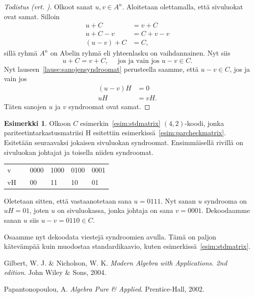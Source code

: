 \documentclass[a4paper,12pt,leqno,oneside]{report} %
\theoremstyle{plain}
\theoremstyle{plain}
\theoremstyle{definition}
\newtheorem{esimerkki}{Esimerkki}[chapter]
\theoremstyle{remark}
\numberwithin{equation}{chapter}
\begin{document}
    \begin{proof}[Todistus \upshape(vrt. {\cite[s.~500]{PA}})]\label{tod:sivuluokkiensyndroomat}
        Olkoot sanat $u, v \in A^n$. Aloitetaan olettamalla, että sivuluokat ovat samat. Silloin
        \begin{align*}
            u + C &= v + C \\
            u + C - v &= C + v - v \\
            (u - v) + C &= C,
        \end{align*}
        sillä ryhmä $A^n$ on Abelin ryhmä eli yhteenlasku on vaihdannainen.
        Nyt siis 
        \[
            u + C = v + C, \quad \text{ jos ja vain jos } u - v \in C.
        \]
        Nyt lauseen~\ref{lause:sanojensyndroomat} perusteella saamme, että $u - v \in C$, jos ja vain jos
        \begin{align*}
            (u - v)H &= 0 \\
            uH &= vH.
        \end{align*}
        Täten sanojen $u$ ja $v$ syndroomat ovat samat.
    \end{proof} 

    \begin{esimerkki}
        Olkoon $C$ esimerkin~\ref{esim:stdmatrix} $(4,2)$-koodi, jonka pariteetintarkastusmatriisi H esitettiin esimerkissä~\ref{esim:parcheckmatrix}. Esitetään seuraavaksi jokaisen sivuluokan syndroomat. Ensimmäisellä rivillä on sivuluokan johtajat ja toisella niiden syndroomat.
        \begin{center}
            \begin{tabular}{llllll}
                v && 0000 & 1000 & 0100 & 0001 \\
                vH  &&  00 & 11 & 10 & 01
            \end{tabular}
        \end{center}
        Oletetaan sitten, että vastaanotetaan sana $u = 0111$. Nyt sanan $u$ syndrooma on $uH = 01$, joten $u$ on sivuluokassa, jonka johtaja on sana $v =0001$. Dekoodaamme sanan $u$ siis $u - v = 0110 \in C$.
        
        Osaamme nyt dekoodata viestejä syndroomien avulla. Tämä on paljon kätevämpää kuin muodostaa standardikaavio, kuten esimerkissä~\ref{esim:stdmatrix}.
    \end{esimerkki}

    \begin{thebibliography}{9}

        Gilbert, W. J. \& Nicholson, W. K.
        \emph{Modern Algebra with Applications. 2nd edition}.
        John Wiley \& Sons, 2004.

        Papantonopoulou, A.
        \emph{Algebra Pure \& Applied}.
        Prentice-Hall, 2002.


\end{thebibliography}
\end{document}
